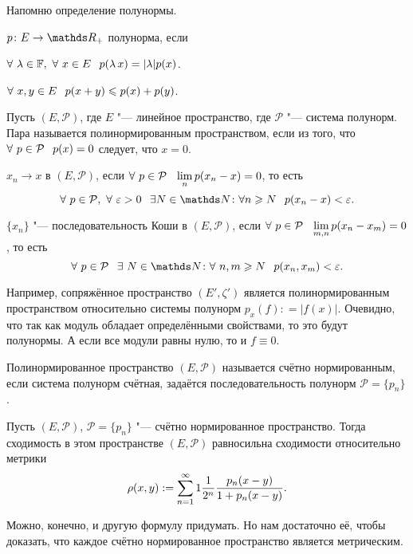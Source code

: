 Напомню определение полунормы.
\begin{Def}
  $p\colon E\to\R_+$ полунорма, если
\begin{roItems}
  \item $\forall\ \l\in\F,\ \forall\ x\in E\pau  p(\lambda\,x) = |\l|p(x)$.
  \item $\forall\ x,y\in E\pau p(x+y)\le p(x)+p(y)$.
\end{roItems}
\end{Def}

\begin{Def}
Пусть $(E,\mathcal P)$, где $E$ "--- линейное пространство, где $\mathcal P$ "--- система полунорм. Пара называется полинормированным пространством, если из того, что $\forall\ p\in\mathcal P\pau p(x)=0$ следует, что $x=0$.
\end{Def}
\begin{Def}
 $x_n\to x$ в $(E,\mathcal P)$, если $\forall\ p\in\mathcal P\pau \lim\limits_n p(x_n-x)=0$, то есть
\[
  \forall\ p\in\mathcal P,\ \forall\ \e>0\pau \exists N\in\N\colon \forall n\ge N\pau p(x_n-x)<\e.
\]
\end{Def}
\begin{Def}
$\{x_n\}$ "--- последовательность Коши в $(E,\mathcal P)$, если $\forall\ p\in\mathcal P\pau \lim\limits_{m,n}p(x_n-x_m)=0$, то есть
\[
  \forall\ p\in\mathcal P\pau \exists\ N\in\N\colon\forall\ n,m\ge N\pau p(x_n,x_m)<\e.
\]
\end{Def}

Например, сопряжённое пространство $(E',\zeta') $ является полинормированным пространством относительно системы полунорм $p_x(f): = \big|f(x)\big|$. Очевидно, что так как модуль обладает определёнными свойствами, то это будут полунормы. А если все модули равны нулю, то и $f\equiv0$.

\begin{Def}
  Полинормированное пространство $(E,\mathcal P)$ называется счётно нормированным, если система полунорм счётная, задаётся последовательность полунорм $\mathcal P = \{p_n\}$.
\end{Def}

\begin{Lem}
  Пусть $(E,\mathcal P)$, $\mathcal P =\{p_n\}$ "--- счётно нормированное пространство. Тогда сходимость в этом пространстве $(E,\mathcal P)$ равносильна сходимости относительно метрики
\[
  \rho(x,y) := \sum\limits_{{n}={1}}^\infty1 \frac1{2^n}\frac{p_n(x-y)}{1+p_n(x-y)}.
\]
\end{Lem}
Можно, конечно, и другую формулу придумать. Но нам достаточно её, чтобы доказать, что каждое счётно нормированное пространство является метрическим.

